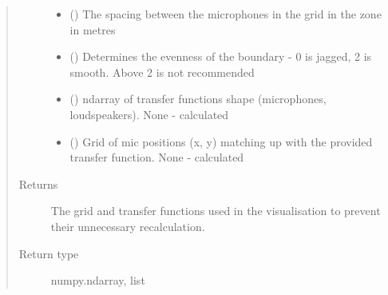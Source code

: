\documentclass[letterpaper,10pt,english]{sphinxmanual}
\begin{document}
\begin{fulllineitems}
\begin{fulllineitems}
\begin{quote}
\begin{description}
\begin{itemize}
\item {} 
 () \textendash{} The spacing between the microphones in the grid in the zone in metres

\item {} 
 () \textendash{} Determines the evenness of the boundary - 0 is jagged, 2 is smooth. Above 2 is not recommended

\item {} 
 () \textendash{} ndarray of transfer functions shape (microphones, loudspeakers). None - calculated

\item {} 
 () \textendash{} Grid of mic positions (x, y) matching up with the provided transfer function. None - calculated

\end{itemize}

\item[{Returns}] \leavevmode
The grid and transfer functions used in the visualisation to prevent their unnecessary recalculation.

\item[{Return type}] \leavevmode
numpy.ndarray, list

\end{description}\end{quote}

\end{fulllineitems}


\end{fulllineitems}

\end{document}
